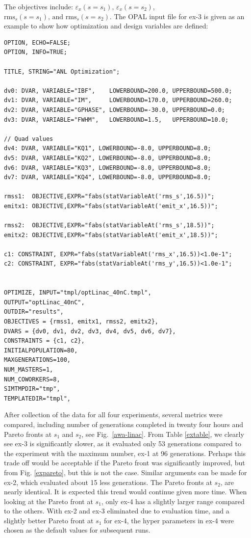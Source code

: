The objectives include: $\varepsilon_{x}\left(s = s_1\right)\text{, } \varepsilon_{x}\left(s = s_2\right)$, $\text{rms}_{s}\left(s = s_1\right)\text{, and }  \text{rms}_{s}\left(s = s_2\right)$. 
The OPAL input file for ex-3 is given as an example to show how optimization and design variables are defined:
%

\begin{Verbatim}[fontsize=\scriptsize]
OPTION, ECHO=FALSE;
OPTION, INFO=TRUE;

TITLE, STRING="ANL Optimization";

dv0: DVAR, VARIABLE="IBF",    LOWERBOUND=200.0, UPPERBOUND=500.0;
dv1: DVAR, VARIABLE="IM",     LOWERBOUND=170.0, UPPERBOUND=260.0;
dv2: DVAR, VARIABLE="GPHASE", LOWERBOUND=-30.0, UPPERBOUND=0.0;
dv3: DVAR, VARIABLE="FWHM",   LOWERBOUND=1.5,   UPPERBOUND=10.0;

// Quad values
dv4: DVAR, VARIABLE="KQ1", LOWERBOUND=-8.0, UPPERBOUND=8.0;
dv5: DVAR, VARIABLE="KQ2", LOWERBOUND=-8.0, UPPERBOUND=8.0;
dv6: DVAR, VARIABLE="KQ3", LOWERBOUND=-8.0, UPPERBOUND=8.0;
dv7: DVAR, VARIABLE="KQ4", LOWERBOUND=-8.0, UPPERBOUND=8.0;

rmss1:  OBJECTIVE,EXPR="fabs(statVariableAt('rms_s',16.5))";
emitx1: OBJECTIVE,EXPR="fabs(statVariableAt('emit_x',16.5))";

rmss2:  OBJECTIVE,EXPR="fabs(statVariableAt('rms_s',18.5))";
emitx2: OBJECTIVE,EXPR="fabs(statVariableAt('emit_x',18.5))";

c1: CONSTRAINT, EXPR="fabs(statVariableAt('rms_x',16.5))<1.0e-1";
c2: CONSTRAINT, EXPR="fabs(statVariableAt('rms_y',16.5))<1.0e-1";


OPTIMIZE, INPUT="tmpl/optLinac_40nC.tmpl",
OUTPUT="optLinac_40nC",
OUTDIR="results",
OBJECTIVES = {rmss1, emitx1, rmss2, emitx2},
DVARS = {dv0, dv1, dv2, dv3, dv4, dv5, dv6, dv7},
CONSTRAINTS = {c1, c2},
INITIALPOPULATION=80,
MAXGENERATIONS=100,
NUM_MASTERS=1,
NUM_COWORKERS=8,
SIMTMPDIR="tmp",
TEMPLATEDIR="tmpl",
\end{Verbatim}

After collection of the data for all four experiments, several metrics
were compared, including number of generations completed in twenty four hours and
Pareto fronts at $s_1$ and $s_2$, see Fig.~\ref{awa-linac}.
From Table \ref{extable}, we clearly see ex-3 is significantly 
slower, as it evaluated only 53 generations 
compared to the experiment with the maximum number, ex-1 at 96 generations.
Perhaps this trade off would be acceptable if the Pareto front was significantly 
improved, but from Fig. \ref{expareto}, but this is not the case.
Similar arguments can be made for ex-2, which evaluated about 15 less generations.
The Pareto fronts at $s_2$, are nearly identical. It is expected
this trend would continue given more time. 
When looking at the Pareto front at $s_1$, only ex-4 has a slightly 
larger range compared to the others.
With ex-2 and ex-3 eliminated due to evaluation time, 
and a slightly better Pareto front at $s_1$ for ex-4, 
the hyper parameters in ex-4 were chosen as the default values for subsequent runs.


